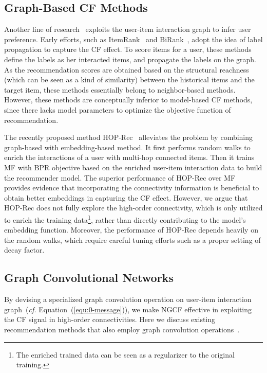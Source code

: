 \documentclass[sigconf]{acmart}
\newcommand{\cf}{\emph{cf. }}
\theoremstyle{definition}
\begin{document}
\subsection{Graph-Based CF Methods}
Another line of research~\cite{RecWalk,BiRank,HOP-rec} exploits the user-item interaction graph to infer user preference.
Early efforts, such as ItemRank~\cite{ItemRank} and BiRank~\cite{BiRank}, adopt the idea of label propagation to capture the CF effect.
To score items for a user, these methods define the labels as her interacted items, and propagate the labels on the graph. 
As the recommendation scores are obtained based on the structural reachness (which can be seen as a kind of similarity) between the historical items and the target item, these methods essentially belong to neighbor-based methods.
However, these methods are conceptually inferior to model-based CF methods, since there lacks model parameters to optimize the objective function of recommendation. 


The recently proposed method HOP-Rec~\cite{HOP-rec} alleviates the problem by combining graph-based with embedding-based method.
It first performs random walks to enrich the interactions of a user with multi-hop connected items.
Then it trains MF with BPR objective based on the enriched user-item interaction data to build the recommender model. 
The superior performance of HOP-Rec over MF provides evidence that incorporating the connectivity information is beneficial to obtain better embeddings in capturing the CF effect.
However, we argue that HOP-Rec does not fully explore the high-order connectivity, which is only utilized to enrich the training data\footnote{The enriched trained data can be seen as a regularizer to the original training.}, rather than directly contributing to the model's embedding function. Moreover, the performance of HOP-Rec depends heavily on the random walks, which require careful tuning efforts such as a proper setting of decay factor.  



\subsection{Graph Convolutional Networks}
By devising a specialized graph convolution operation on user-item interaction graph~(\cf Equation~(\ref{equ:0-message})), we make NGCF effective in exploiting the CF signal in high-order connectivities. Here we discuss existing recommendation methods that also employ graph convolution operations~\cite{GC-MC,PinSage,SpectralCF}. 
\end{document}
